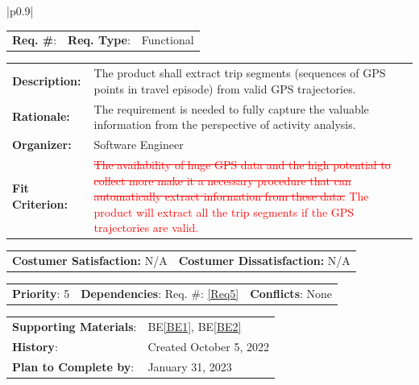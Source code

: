 \documentclass[12pt, titlepage]{article}
\newcommand{\beref}[1]{BE\ref{#1}}
\newcounter{reqnum}
\newcommand{\reqthereqnum}{\textbf{Req. \#}: \thereqnum}
\newcommand{\reqref}[1]{Req. \#: \ref{#1}}
\newenvironment{boxed}
    {\begin{center}
    \begin{tabular}{|p{0.9\textwidth}|}
    \hline\\
    }
    { 
    \\\\\hline
    \end{tabular} 
    \end{center}
    }
\begin{document}
\begin{boxed}
\begin{tabular}{l r r}
{reqnum} \reqthereqnum \label{Req6} & {\bf Req. Type}: &  Functional\\
\end{tabular}
\newline
\begin{tabular}{l p{11.5cm}}
    {\bf Description:} & The product shall extract trip segments (sequences of GPS points in travel episode) from valid GPS trajectories.  \\
    {\bf Rationale:} & The requirement is needed to fully capture the valuable information from the perspective of activity analysis.\\
    {\bf Organizer:} & Software Engineer\\
    {\bf Fit Criterion:} & \textcolor{red}{\sout{The availability of huge GPS data and the high potential to collect more make it a necessary procedure that can automatically extract information from these data.}
    The product will extract all the trip segments if the GPS trajectories are valid.}\\
\end{tabular}
\begin{tabular}{l r}
{\bf Costumer Satisfaction:} N/A &  {\bf Costumer Dissatisfaction:}  N/A\\
\end{tabular}
\begin{tabular}{l r r}
    {\bf Priority}: 5 & {\bf Dependencies}: \reqref{Req5} & {\bf Conflicts}: None \\
\end{tabular}
\begin{tabular}{l l}
     {\bf Supporting Materials}:& 
     \beref{BE1}, \beref{BE2} \\ 
     {\bf History}: & Created October 5, 2022\\
     {\bf Plan to Complete by}: & January 31, 2023\\
\end{tabular}
\end{boxed}
\end{document}
